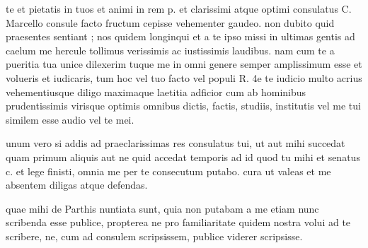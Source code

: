 


 te et pietatis in tuos et animi in rem p. et clarissimi atque optimi consulatus C. Marcello consule facto fructum cepisse vehementer gaudeo. non dubito quid praesentes sentiant ; nos quidem longinqui et a te ipso missi in ultimas gentis ad caelum me hercule tollimus verissimis ac iustissimis laudibus. nam cum te a pueritia tua unice dilexerim tuque me in omni genere semper amplissimum esse et volueris et iudicaris, tum hoc vel tuo facto vel populi R. 4e te iudicio multo acrius vehementiusque diligo maximaque laetitia adficior cum ab hominibus prudentissimis virisque optimis omnibus dictis, factis, studiis, institutis vel me tui similem esse audio vel te mei.

 unum vero si addis ad praeclarissimas res consulatus tui, ut aut mihi succedat quam primum aliquis aut ne quid accedat temporis ad id quod tu mihi et senatus c. et lege finisti, omnia me per te consecutum putabo. cura ut valeas et me absentem diligas atque defendas.

 quae mihi de Parthis nuntiata sunt, quia non putabam a me etiam nunc scribenda esse publice, propterea ne pro familiaritate quidem nostra volui ad te scribere, ne, cum ad consulem scripsissem, publice viderer scripsisse.

